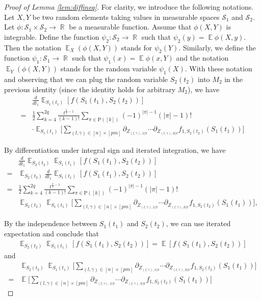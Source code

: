\documentclass[11pt]{amsart}
\numberwithin{equation}{section}
\numberwithin{equation}{section}
\DeclareMathOperator{\E}{\mathbb{E}}
\DeclareMathOperator{\R}{\mathbb{R}}
\theoremstyle{remark}
\theoremstyle{definition}
\begin{document}
\begin{proof}[Proof of Lemma \ref{lem:diffineq}]
For clarity, we introduce the following notations. Let $X,Y$ be two random elements taking values in measurable spaces $\mathscr{S}_1$ and $\mathscr{S}_2$. Let $\phi:\mathscr{S}_1 \times \mathscr{S}_2 \to \R$ be a measurable function. Assume that $\phi(X,Y)$ is integrable. Define the function $\psi_2:\mathscr{S}_2 \to \R$ such that $\psi_2(y)=\E\phi(X,y)$. Then the notation $\E_X(\phi(X,Y))$ stands for $\psi_2(Y)$. Similarly, we define the function $\psi_1:\mathscr{S}_1 \to \R$ such that $\psi_1(x)=\E\phi(x,Y)$ and the notation $\E_Y(\phi(X,Y))$ stands for the random variable $\psi_1(X)$. With these notation and observing that we can plug the random variable $S_2(t_2)$ into $M_2$ in the previous identity (since the identity holds for arbitrary $M_2$), we have
\begin{align*}
	&\frac{d}{dt_1}\E_{S_1(t_1)}[f(S_1(t_1),S_2(t_2))] \\=& 
	\frac{1}{2}\sum_{k=4}^{2q}
	\frac{t^{\frac{k}{2}-1}}{(k-1)!}
	\sum_{\pi\in\mathrm{P}([k])}
	(-1)^{|\pi|-1}(|\pi|-1)!\,
	\\ &\cdot\E_{S_1(t_1)}\Bigg[ \sum_{(l,\gamma) \in [n] \times [pm]} \partial_{Z_{(l,\gamma),1|\pi}}\cdots\partial_{Z_{(l,\gamma),k|\pi}}f_{1,S_2(t_2)}(S_1(t_1))
	\Bigg]
\end{align*}

By differentiation under integral sign \cite[Theorem 2.27]{folland2013real} and iterated integration, we have
\begin{align*}
	&\frac{d}{dt_1}\E_{S_2(t_2)}\E_{S_1(t_1)}[f(S_1(t_1),S_2(t_2))] \\=& \E_{S_2(t_2)}\frac{d}{dt_1}\E_{S_1(t_1)}[f(S_1(t_1),S_2(t_2))]
 \\=&
	\frac{1}{2}\sum_{k=4}^{2q}
	\frac{t^{\frac{k}{2}-1}}{(k-1)!}
	\sum_{\pi\in\mathrm{P}([k])}
	(-1)^{|\pi|-1}(|\pi|-1)!\,
	\\&\E_{S_2(t_2)}\E_{S_1(t_1)}\Bigg[ \sum_{(l,\gamma) \in [n] \times [pm]} \partial_{Z_{(l,\gamma),1|\pi}}\cdots\partial_{Z_{(l,\gamma),k|\pi}}f_{1,S_2(t_2)}(S_1(t_1))
	\Bigg],
\end{align*}

By the independence between $S_1(t_1)$ and $S_2(t_2)$, we can use iterated expectation and conclude that
\begin{align*}
    \E_{S_2(t_2)}\E_{S_1(t_1)}[f(S_1(t_1),S_2(t_2))]=\E[f(S_1(t_1),S_2(t_2))]
\end{align*}
and
\begin{align*}
    &\E_{S_2(t_2)}\E_{S_1(t_1)}\Bigg[ \sum_{(l,\gamma) \in [n] \times [pm]} \partial_{Z_{(l,\gamma),1|\pi}}\cdots\partial_{Z_{(l,\gamma),k|\pi}}f_{1,S_2(t_2)}(S_1(t_1))
	\Bigg]\\=&\E\Bigg[ \sum_{(l,\gamma) \in [n] \times [pm]} \partial_{Z_{(l,\gamma),1|\pi}}\cdots\partial_{Z_{(l,\gamma),k|\pi}}f_{1,S_2(t_2)}(S_1(t_1))
	\Bigg]
\end{align*}


\end{proof}
\end{document}
